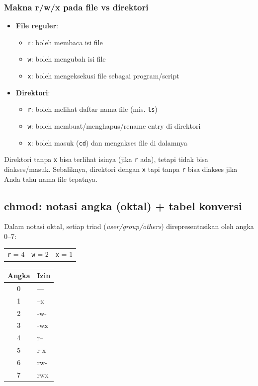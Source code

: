 \subsubsection*{Makna r/w/x pada file vs direktori}
\begin{itemize}
    \item \textbf{File reguler}:
    \begin{itemize}
        \item \texttt{r}: boleh membaca isi file
        \item \texttt{w}: boleh mengubah isi file
        \item \texttt{x}: boleh mengeksekusi file sebagai program/script
    \end{itemize}
    \item \textbf{Direktori}:
    \begin{itemize}
        \item \texttt{r}: boleh melihat daftar nama file (mis. \texttt{ls})
        \item \texttt{w}: boleh membuat/menghapus/rename entry di direktori
        \item \texttt{x}: boleh masuk (\texttt{cd}) dan mengakses file di dalamnya
    \end{itemize}
\end{itemize}

\begin{warningbox}
Direktori tanpa \texttt{x} bisa terlihat isinya (jika \texttt{r} ada), tetapi tidak bisa diakses/masuk.
Sebaliknya, direktori dengan \texttt{x} tapi tanpa \texttt{r} bisa diakses jika Anda tahu nama file tepatnya.
\end{warningbox}

\subsection*{chmod: notasi angka (oktal) + tabel konversi}
Dalam notasi oktal, setiap triad (\textit{user/group/others}) direpresentasikan oleh angka 0--7:
\begin{center}
\begin{tabular}{lll}
\texttt{r} = 4 & \texttt{w} = 2 & \texttt{x} = 1 \\
\end{tabular}
\end{center}

\begin{center}
\begin{tabular}{cl}
\textbf{Angka} & \textbf{Izin} \\
\hline
0 & --- \\
1 & --x \\
2 & -w- \\
3 & -wx \\
4 & r-- \\
5 & r-x \\
6 & rw- \\
7 & rwx \\
\end{tabular}
\end{center}


